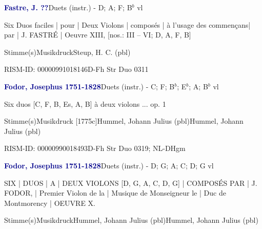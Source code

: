 \documentclass[twocolumn]{book}
\begin{document}
\par \vspace{7pt} \textcolor{darkblue}{\textbf{Fastre, J.  ??}}\hfillplus{\textbf{[269]}}\newline Duets (instr.) - D; A; F; B$^b$ vl
\par \begin{itshape}Six Duos faciles | pour | Deux Violons | composés | à l'usage des commençans| par | J. FASTRÉ | Oeuvre XIII, [nos.: III – VI; D, A, F, B]\end{itshape} 
\par \textcolor{darkblue}{}  Stimme(s)\newline Musikdruck\newline Steup, H. C.  (pbl)
\par RISM-ID: 00000991018146\newline D-Fh  Str Duo 0311
\par \vspace{7pt} \textcolor{darkblue}{\textbf{Fodor, Josephus  1751-1828}}\hfillplus{\textbf{[270]}}\newline Duets (instr.) - C; F; B$^b$; E$^b$; A; B$^b$ vl
\par \begin{itshape}Six duos [C, F, B, Es, A, B] à deux violons ... op. 1\end{itshape} 
\par \textcolor{darkblue}{}  Stimme(s)\newline Musikdruck  [1775c]\newline Hummel, Johann Julius  (pbl)\newline Hummel, Johann Julius  (pbl)
\par RISM-ID: 00000990018493\newline D-Fh  Str Duo 0319; NL-DHgm
\par \vspace{7pt} \textcolor{darkblue}{\textbf{Fodor, Josephus  1751-1828}}\hfillplus{\textbf{[271]}}\newline Duets (instr.) - D; G; A; C; D; G vl
\par \begin{itshape}SIX | DUOS | A | DEUX VIOLONS [D, G, A, C, D, G] | COMPOSÉS PAR | J. FODOR, | Premier Violon de la | Musique de Monseigneur le | Duc de Montmorency | OEUVRE X.\end{itshape} 
\par \textcolor{darkblue}{}  Stimme(s)\newline Musikdruck\newline Hummel, Johann Julius  (pbl)\newline Hummel, Johann Julius  (pbl)
\end{document}
